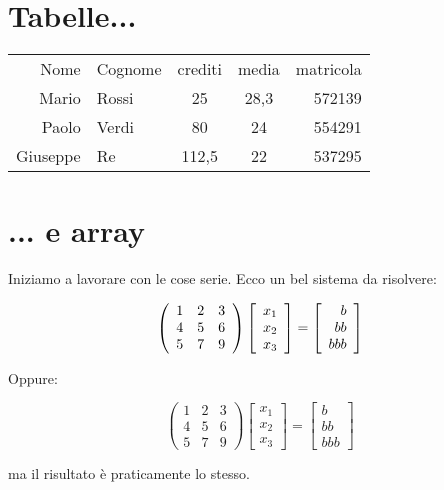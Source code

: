 \section{Tabelle...}

\begin{tabular}{rlccr} %
    \toprule
        Nome & Cognome & crediti & media & matricola \\
    \cmidrule(r){1-2}
    \cmidrule(rl){3-4}
    \cmidrule(l){5-5}
        Mario & Rossi & 25 & 28,3 & 572139 \\
        Paolo & Verdi & 80 & 24 & 554291 \\
        Giuseppe & Re & 112,5 & 22 & 537295 \\
    \bottomrule
\end{tabular}

\section{... e array}

Iniziamo a lavorare con le cose serie. Ecco un bel sistema da risolvere:

\[
  \left(
  \begin{array}{c c c}
    1 & 2 & 3 \\
    4 & 5 & 6 \\
    5 & 7 & 9
  \end{array}
  \right) \left[
  \begin{array}{l}
    x_1 \\ x_2 \\ x_3
  \end{array}
  \right] = \left[
  \begin{array}{r}
    b \\ bb \\ bbb
  \end{array}
  \right]
\]

Oppure:

\[
  \begin{pmatrix}
    1 & 2 & 3 \\
    4 & 5 & 6 \\
    5 & 7 & 9
  \end{pmatrix}
  \begin{bmatrix}
    x_1 \\ x_2 \\ x_3
  \end{bmatrix}
  =
  \begin{bmatrix}
    b \\ bb \\ bbb
  \end{bmatrix}
\]

ma il risultato \`e praticamente lo stesso.